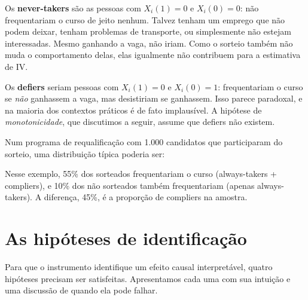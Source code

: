 Os \textbf{never-takers} são as pessoas com $X_i(1) = 0$ e $X_i(0) = 0$: não frequentariam o curso de jeito nenhum. Talvez tenham um emprego que não podem deixar, tenham problemas de transporte, ou simplesmente não estejam interessadas. Mesmo ganhando a vaga, não iriam. Como o sorteio também não muda o comportamento delas, elas igualmente não contribuem para a estimativa de IV.

Os \textbf{defiers} seriam pessoas com $X_i(1) = 0$ e $X_i(0) = 1$: frequentariam o curso se \textit{não} ganhassem a vaga, mas desistiriam se ganhassem. Isso parece paradoxal, e na maioria dos contextos práticos é de fato implausível. A hipótese de \textit{monotonicidade}, que discutimos a seguir, assume que defiers não existem.

\begin{exemplobox}
Num programa de requalificação com 1.000 candidatos que participaram do sorteio, uma distribuição típica poderia ser:

\begin{center}
\end{center}

Nesse exemplo, 55\% dos sorteados frequentariam o curso (always-takers + compliers), e 10\% dos não sorteados também frequentariam (apenas always-takers). A diferença, 45\%, é a proporção de compliers na amostra.
\end{exemplobox}

\section{As hipóteses de identificação}
\label{sec:hipoteses_binario}

Para que o instrumento identifique um efeito causal interpretável, quatro hipóteses precisam ser satisfeitas. Apresentamos cada uma com sua intuição e uma discussão de quando ela pode falhar.

